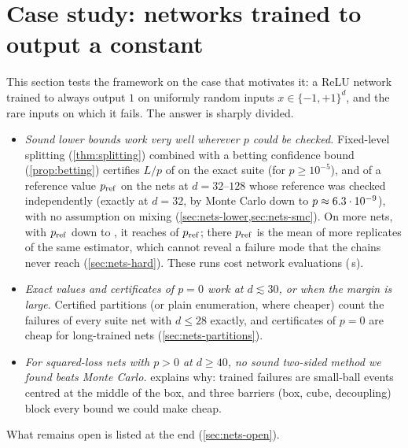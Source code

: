 \section{Case study: networks trained to output a constant}\label{sec:nets}

This section tests the framework on the case that motivates it: a ReLU network
trained to always output $1$ on uniformly random inputs $x\in\{-1,+1\}^d$, and the rare
inputs on which it fails. The answer is sharply divided.
\begin{itemize}
\item \emph{Sound lower bounds work very well wherever $p$ could be checked.}
Fixed-level splitting (\cref{thm:splitting}) combined with a betting confidence bound
(\cref{prop:betting}) certifies $L/p$ of \nnSuiteRatioL{} on the exact suite (for
$p\ge10^{-5}$), and \nnScaleRatioChecked{} of a reference value $p_{\rm ref}$ on the
\nnScaleChecked{} nets at $d=32$--$128$ whose reference was checked independently
(exactly at $d=32$, by Monte Carlo down to $p\approx6.3\cdot10^{-9}$), with no
assumption on mixing (\cref{sec:nets-lower,sec:nets-smc}). On \nnScaleUnchecked{}
more nets, with $p_{\rm ref}$ down to \nnBigPref, it reaches \nnScaleRatioUnchecked{}
of $p_{\rm ref}$; there $p_{\rm ref}$ is the mean of more replicates of the same
estimator, which cannot reveal a failure mode that the chains never reach
(\cref{sec:nets-hard}). These runs cost \nnScaleFpe{} network evaluations
(\nnScaleSec{}\,s).
\item \emph{Exact values and certificates of $p=0$ work at $d\lesssim30$, or when the
margin is large.} Certified partitions (or plain enumeration, where cheaper) count
the failures of every suite net with $d\le28$ exactly, and certificates of $p=0$ are
cheap for long-trained nets (\cref{sec:nets-partitions}).
\item \emph{For squared-loss nets with $p>0$ at $d\ge40$, no sound two-sided method we
found beats Monte Carlo.}  explains why: trained failures are
small-ball events centred at the middle of the box, and three barriers (box, cube,
decoupling) block every bound we could make cheap.
\end{itemize}
What remains open is listed at the end (\cref{sec:nets-open}).

